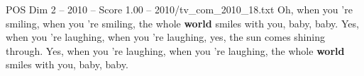 \begin{textsample}{POS Dim 2 – 2010 – Score 1.00 – 2010/tv\_com\_2010\_18.txt}  \label{ex:f2_pos_050}
Oh, when you 're smiling, when you 're smiling, the whole \textbf{world} smiles with you, baby, baby.
Yes, when you 're laughing, when you 're laughing, yes, the sun comes shining through.
Yes, when you 're laughing, when you 're laughing, the whole \textbf{world} smiles with you, baby, baby.

\end{textsample}
